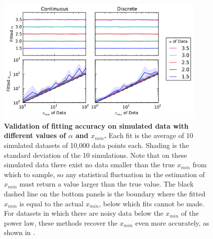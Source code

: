 \documentclass[10pt]{article}
\begin{document}



\pagebreak

\setcounter{figure}{0}
\renewcommand{\thefigure}{S\arabic{figure}}

\begin{figure}[!ht]
\begin{center}
\includegraphics[width=4in]{Fig_powerlaw_validation.pdf}
\end{center}
\caption{
{\bf Validation of fitting accuracy on simulated data with different values of $\alpha$ and $x_{min}$.} Each fit is the average of 10 simulated datasets of 10,000 data points each. Shading is the standard deviation of the 10 simulations. Note that on these simulated data there exist no data smaller than the true $x_{min}$ from which to sample, so any statistical fluctuation in the estimation of $x_{min}$ must return a value larger than the true value. The black dashed line on the bottom panels is the boundary where the fitted $x_{min}$ is equal to the actual $x_{min}$, below which fits cannot be made. For datasets in which there are noisy data below the $x_{min}$ of the power law, these methods recover the $x_{min}$ even more accurately, as shown in \cite{Clauset2009}.
}
\label{powerlaw_validation}
\end{figure}
\end{document}
